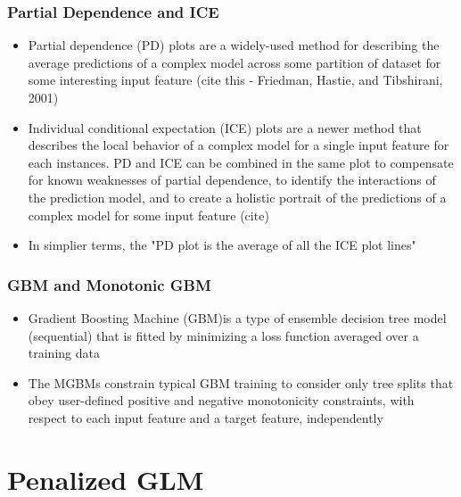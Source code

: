 \documentclass[11pt,aspectratio=169,hyperref={colorlinks}]{beamer}
\begin{document}
		\begin{frame}
		
			\frametitle{Partial Dependence and ICE}			
			
			\begin{itemize}
			\item{Partial dependence (PD) plots are a widely-used method for describing the average predictions of a complex model across some partition of dataset for some interesting input feature (cite this - Friedman, Hastie, and Tibshirani, 2001)}
			\item{Individual conditional expectation (ICE) plots are a newer method that describes the local behavior of a complex model for a single input feature for each instances.  PD and ICE can be combined in the same plot to compensate for known weaknesses of partial dependence, to identify the interactions of the prediction model, and to create a holistic portrait of the predictions of a complex model for some input feature (cite)}
			\item{In simplier terms, the "PD plot is the average of all the ICE plot lines"}
			\end{itemize} 			
					
		\end{frame}		
		
		\begin{frame}
		
			\frametitle{GBM and Monotonic GBM}			
				  			
			\begin{itemize}
			\item{Gradient Boosting Machine (GBM)is a type of ensemble decision tree model (sequential) that is fitted by minimizing a loss function averaged over a training data}
			\item{The MGBMs constrain typical GBM training to consider only tree splits that obey user-defined positive and negative monotonicity constraints, with respect to each input feature and a target feature, independently}
			\end{itemize}
			
		\end{frame}	
				
	\section{Penalized GLM}
	
\end{document}
